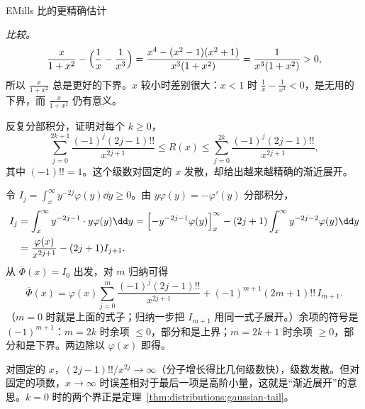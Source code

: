 \begin{probleme}[问题]{E}{Mills 比的更精确估计}
\begin{questions}
\begin{solution}
\emph{比较。}
\[
\frac x{1+x^2}-\Bigl(\frac1x-\frac1{x^3}\Bigr)=\frac{x^4-(x^2-1)(x^2+1)}{x^3(1+x^2)}=\frac1{x^3(1+x^2)}>0,
\]
所以 $\frac x{1+x^2}$ 总是更好的下界。$x$ 较小时差别很大：$x<1$ 时 $\frac1x-\frac1{x^3}<0$，是无用的下界，而 $\frac x{1+x^2}$ 仍有意义。
\end{solution}
\item 反复分部积分，证明对每个 $k\geqslant0$，
\[
\sum_{j=0}^{2k+1}\frac{(-1)^j(2j-1)!!}{x^{2j+1}}\leqslant R(x)\leqslant\sum_{j=0}^{2k}\frac{(-1)^j(2j-1)!!}{x^{2j+1}},
\]
其中 $(-1)!!=1$。这个级数对固定的 $x$ 发散，却给出越来越精确的渐近展开。
\begin{solution}
令 $I_j=\int_x^\infty y^{-2j}\varphi(y)\dd y\geqslant0$。由 $y\varphi(y)=-\varphi'(y)$ 分部积分，
\[
\begin{aligned}
I_j&=\int_x^\infty y^{-2j-1}\cdot y\varphi(y)\dd y=\Bigl[-y^{-2j-1}\varphi(y)\Bigr]_x^\infty-(2j+1)\int_x^\infty y^{-2j-2}\varphi(y)\dd y\\
&=\frac{\varphi(x)}{x^{2j+1}}-(2j+1)I_{j+1}.
\end{aligned}
\]
从 $\overline\Phi(x)=I_0$ 出发，对 $m$ 归纳可得
\[
\overline\Phi(x)=\varphi(x)\sum_{j=0}^m\frac{(-1)^j(2j-1)!!}{x^{2j+1}}+(-1)^{m+1}(2m+1)!!\,I_{m+1}.
\]
（$m=0$ 时就是上面的式子；归纳一步把 $I_{m+1}$ 用同一式子展开。）余项的符号是 $(-1)^{m+1}$：$m=2k$ 时余项 $\leqslant0$，部分和是上界；$m=2k+1$ 时余项 $\geqslant0$，部分和是下界。两边除以 $\varphi(x)$ 即得。

对固定的 $x$，$(2j-1)!!/x^{2j}\to\infty$（分子增长得比几何级数快），级数发散。但对固定的项数，$x\to\infty$ 时误差相对于最后一项是高阶小量，这就是“渐近展开”的意思。$k=0$ 时的两个界正是定理~\ref{thm:distributions:gaussian-tail}。
\end{solution}
\end{questions}
\end{probleme}

